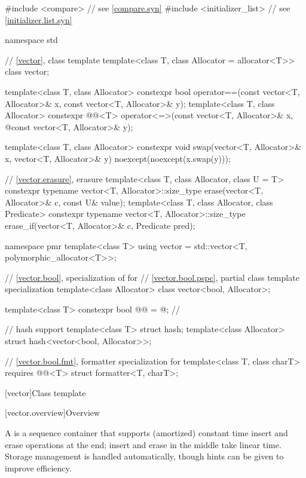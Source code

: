 %
\begin{codeblock}
#include <compare>              // see \ref{compare.syn}
#include <initializer_list>     // see \ref{initializer.list.syn}

namespace std {
  // \ref{vector}, class template 
  template<class T, class Allocator = allocator<T>> class vector;

  template<class T, class Allocator>
    constexpr bool operator==(const vector<T, Allocator>& x, const vector<T, Allocator>& y);
  template<class T, class Allocator>
    constexpr @@<T> operator<=>(const vector<T, Allocator>& x,
              @\itcorr@                                      const vector<T, Allocator>& y);

  template<class T, class Allocator>
    constexpr void swap(vector<T, Allocator>& x, vector<T, Allocator>& y)
      noexcept(noexcept(x.swap(y)));

  // \ref{vector.erasure}, erasure
  template<class T, class Allocator, class U = T>
    constexpr typename vector<T, Allocator>::size_type
      erase(vector<T, Allocator>& c, const U& value);
  template<class T, class Allocator, class Predicate>
    constexpr typename vector<T, Allocator>::size_type
      erase_if(vector<T, Allocator>& c, Predicate pred);

  namespace pmr {
    template<class T>
      using vector = std::vector<T, polymorphic_allocator<T>>;
  }

  // \ref{vector.bool}, specialization of  for 
  // \ref{vector.bool.pspc}, partial class template specialization 
  template<class Allocator>
    class vector<bool, Allocator>;

  template<class T>
    constexpr bool @@ = @\seebelow@;          // \expos

  // hash support
  template<class T> struct hash;
  template<class Allocator> struct hash<vector<bool, Allocator>>;

  // \ref{vector.bool.fmt}, formatter specialization for 
  template<class T, class charT> requires @@<T>
    struct formatter<T, charT>;
}
\end{codeblock}

[vector]{Class template }

[vector.overview]{Overview}

\pnum
{}%
A
is a sequence container that supports
(amortized) constant time insert and erase operations at the end;
insert and erase in the middle take linear time.
Storage management is handled automatically, though hints can be given
to improve efficiency.

